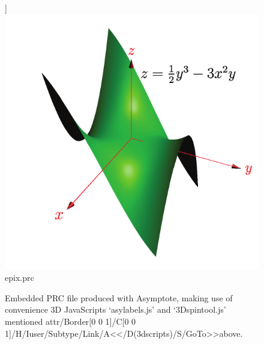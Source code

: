 \documentclass[a4paper]{article}
\begin{document}
\begin{figure}[bp]
]{\includegraphics{epixposter}}{epix.prc}
\caption{Embedded PRC file produced with Asymptote, making use of convenience 3D JavaScripts `asylabels.js' and `3Dspintool.js' mentioned
{\leavevmode\pdfstartlink attr{/Border[0 0 1]/C[0 0 1]/H/I}user{/Subtype/Link/A<</D(3dscripts)/S/GoTo>>}above\pdfendlink}.}\label{asyex}
\end{figure}
\end{document}
